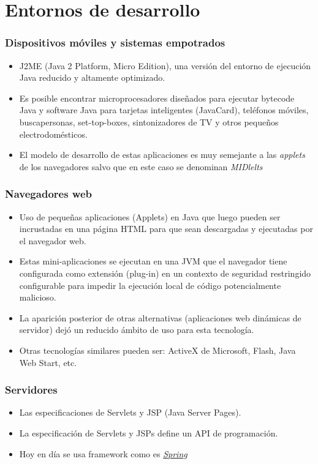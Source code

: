 \documentclass{beamer}
\begin{document}
\section{Entornos de desarrollo}
\begin{frame}
\frametitle{Dispositivos móviles y sistemas empotrados}
\begin{itemize}[<+->]
\item J2ME (Java 2 Platform, Micro Edition), una versión del entorno de ejecución Java reducido y altamente optimizado. 
\item Es posible encontrar microprocesadores diseñados para ejecutar bytecode Java y software Java para tarjetas inteligentes (JavaCard), teléfonos móviles, buscapersonas, set-top-boxes, sintonizadores de TV y otros pequeños electrodomésticos.
\item El modelo de desarrollo de estas aplicaciones es muy semejante a las \emph{applets} de los navegadores salvo que en este caso se denominan \emph{MIDlelts}
\end{itemize} 
\end{frame}

\begin{frame}
\frametitle{Navegadores web}
\begin{itemize}[<+->]
\item Uso de pequeñas aplicaciones (Applets) en Java que luego pueden ser incrustadas en una página HTML para que sean descargadas y ejecutadas por el navegador web. 
\item Estas mini-aplicaciones se ejecutan en una JVM que el navegador tiene configurada como extensión (plug-in) en un contexto de seguridad restringido configurable para impedir la ejecución local de código potencialmente malicioso.
\item La aparición posterior de otras alternativas (aplicaciones web dinámicas de servidor) dejó un reducido ámbito de uso para esta tecnología.  
\item Otras tecnologías similares pueden ser: ActiveX de Microsoft, Flash, Java Web Start, etc.
\end{itemize} 
\end{frame}

\begin{frame}
\frametitle{Servidores}
\begin{itemize}[<+->]
\item Las especificaciones de Servlets y JSP (Java Server Pages).
\item La especificación de Servlets y JSPs define un API de programación.
\item Hoy en día se usa framework como es \href{https://www.1and1.es/digitalguide/paginas-web/desarrollo-web/spring-framework-la-columna-vertebral-de-java/}{\emph{Spring}}
\end{itemize}
\end{frame}
\end{document}
